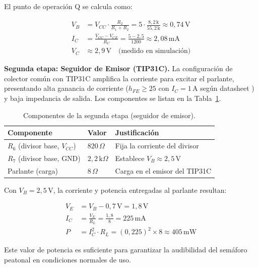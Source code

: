 \documentclass[12pt,onecolumn]{IEEEtran}
\begin{document}
El punto de operación Q se calcula como:

\begin{align}
    V_B &= V_{CC} \cdot \frac{R_2}{R_1 + R_2}
         = 5 \cdot \frac{8{,}2\,\text{k}}{55{,}2\,\text{k}}
         \approx 0{,}74\,\text{V} \\
    I_C &= \frac{V_{CC} - V_{CE}}{R_C}
         = \frac{5 - 2{,}5}{1200}
         \approx 2{,}08\,\text{mA} \\
    V_C &\approx 2{,}9\,\text{V} \quad \text{(medido en simulación)}
\end{align}

\textbf{Segunda etapa: Seguidor de Emisor (TIP31C).}
La configuración de colector común con TIP31C amplifica la corriente para excitar el parlante, presentando alta ganancia de corriente ($h_{FE} \geq 25$ con $I_C = 1\,\text{A}$ según datasheet \cite{tip31ds}) y baja impedancia de salida. Los componentes se listan en la Tabla~\ref{tab:seguidor_emisor}.

\begin{table}[H]
\centering
\caption{Componentes de la segunda etapa (seguidor de emisor).}
\label{tab:seguidor_emisor}
\begin{tabular}{lll}
\toprule
\textbf{Componente} & \textbf{Valor} & \textbf{Justificación} \\
\midrule
$R_6$ (divisor base, $V_{CC}$) & $820\,\Omega$           & Fija la corriente del divisor \\
$R_7$ (divisor base, GND)      & $2{,}2\,\text{k}\Omega$ & Establece $V_B \approx 2{,}5\,\text{V}$ \\
Parlante (carga)               & $8\,\Omega$             & Carga en el emisor del TIP31C \\
\bottomrule
\end{tabular}
\end{table}

Con $V_B = 2{,}5\,\text{V}$, la corriente y potencia entregadas al parlante resultan:

\begin{align}
    V_E &= V_B - 0{,}7\,\text{V} = 1{,}8\,\text{V} \\
    I_C &= \frac{V_E}{R_L} = \frac{1{,}8}{8} = 225\,\text{mA} \\
    P   &= I_C^2 \cdot R_L = (0{,}225)^2 \times 8 \approx 405\,\text{mW}
\end{align}

Este valor de potencia es suficiente para garantizar la audibilidad del semáforo peatonal en condiciones normales de uso.
\end{document}
